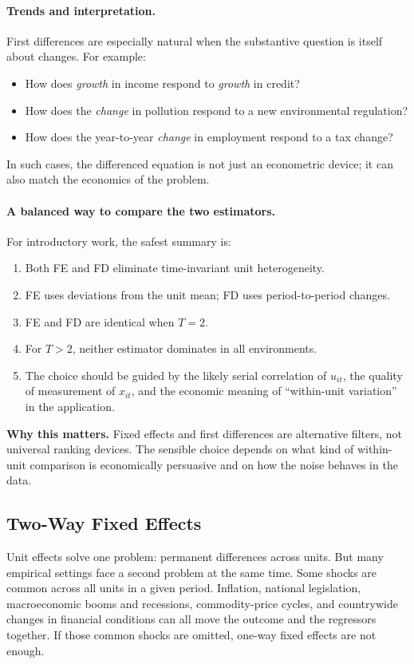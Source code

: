 \paragraph{Trends and interpretation.}
First differences are especially natural when the substantive question is itself about changes. For example:
\begin{itemize}
\item How does \emph{growth} in income respond to \emph{growth} in credit?
\item How does the \emph{change} in pollution respond to a new environmental regulation?
\item How does the year-to-year \emph{change} in employment respond to a tax change?
\end{itemize}
In such cases, the differenced equation is not just an econometric device; it can also match the economics of the problem.

\paragraph{A balanced way to compare the two estimators.}
For introductory work, the safest summary is:
\begin{enumerate}
\item Both FE and FD eliminate time-invariant unit heterogeneity.
\item FE uses deviations from the unit mean; FD uses period-to-period changes.
\item FE and FD are identical when $T=2$.
\item For $T>2$, neither estimator dominates in all environments.
\item The choice should be guided by the likely serial correlation of $u_{it}$, the quality of measurement of $x_{it}$, and the economic meaning of ``within-unit variation'' in the application.
\end{enumerate}

\begin{boxD}
\textbf{Why this matters.}
Fixed effects and first differences are alternative filters, not universal ranking devices. The sensible choice depends on what kind of within-unit comparison is economically persuasive and on how the noise behaves in the data.
\end{boxD}

\subsection{Two-Way Fixed Effects}
Unit effects solve one problem: permanent differences across units. But many empirical settings face a second problem at the same time. Some shocks are common across all units in a given period. Inflation, national legislation, macroeconomic booms and recessions, commodity-price cycles, and countrywide changes in financial conditions can all move the outcome and the regressors together. If those common shocks are omitted, one-way fixed effects are not enough.

